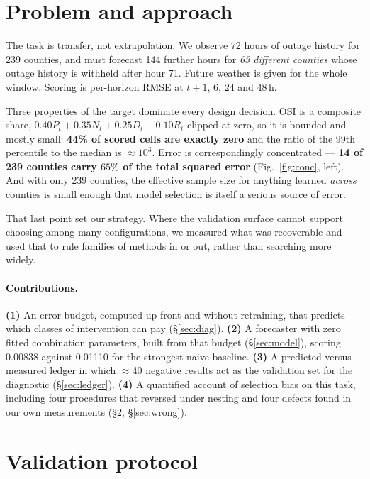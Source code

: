 \documentclass[10pt,letterpaper,twocolumn]{article}
\begin{document}
\section{Problem and approach}

The task is transfer, not extrapolation. We observe 72 hours of outage history
for 239 counties, and must forecast 144 further hours for \emph{63 different
counties} whose outage history is withheld after hour 71. Future weather is
given for the whole window. Scoring is per-horizon RMSE at $t+1$, $6$, $24$ and
$48$\,h.

Three properties of the target dominate every design decision. OSI is a
composite share, $0.40P_t + 0.35N_t + 0.25D_t - 0.10R_t$ clipped at zero, so it
is bounded and mostly small: \textbf{44\% of scored cells are exactly zero} and
the ratio of the 99th percentile to the median is $\approx 10^3$. Error is
correspondingly concentrated --- \textbf{14 of 239 counties carry $65\%$
of the total squared error} (Fig.~\ref{fig:conc}, left). And with only 239 counties, the effective sample
size for anything learned \emph{across} counties is small enough that model
selection is itself a serious source of error.

That last point set our strategy. Where the validation surface cannot support
choosing among many configurations, we measured what was recoverable and used
that to rule families of methods in or out, rather than searching more widely.

\paragraph{Contributions.}
\textbf{(1)} An error budget, computed up front and without retraining, that
predicts which classes of intervention can pay (§\ref{sec:diag}).
\textbf{(2)} A forecaster with zero fitted combination parameters, built from
that budget (§\ref{sec:model}), scoring 0.00838 against 0.01110 for the
strongest naive baseline.
\textbf{(3)} A predicted-versus-measured ledger in which $\approx$40 negative
results act as the validation set for the diagnostic (§\ref{sec:ledger}).
\textbf{(4)} A quantified account of selection bias on this task, including four
procedures that reversed under nesting and four defects found in our own
measurements (§\ref{sec:proto}, §\ref{sec:wrong}).

\section{Validation protocol}
\label{sec:proto}
\end{document}
